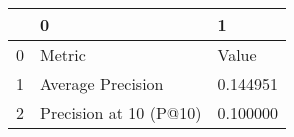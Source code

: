 \begin{tabular}{lll}
\toprule
 & 0 & 1 \\
\midrule
0 & Metric & Value \\
1 & Average Precision & 0.144951 \\
2 & Precision at 10 (P@10) & 0.100000 \\
\bottomrule
\end{tabular}

